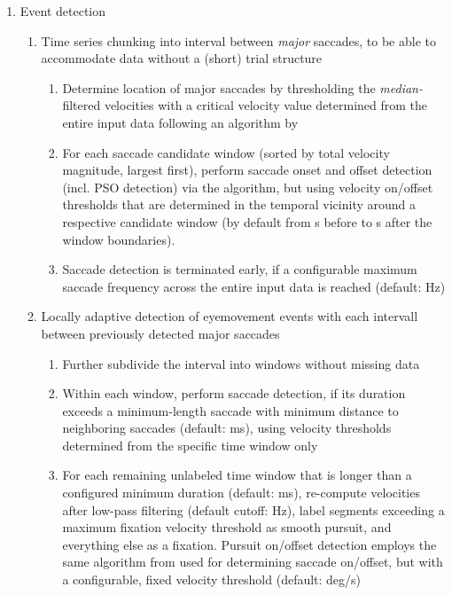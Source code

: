 \documentclass[10pt,a4paper]{extarticle}
\begin{document}
\begin{enumerate}
\begin{enumerate}
    \end{enumerate}
  \item Event detection
    \begin{enumerate}
      \item Time series chunking into interval between \textit{major} saccades, to be able to accommodate data without a (short) trial structure
        \begin{enumerate}
          \item Determine location of major saccades by thresholding the \textit{median-}filtered velocities with a critical velocity value determined from the entire input data following an algorithm by \citep{Nystrom2010AnData}
          \item For each saccade candidate window (sorted by total velocity magnitude, largest first), perform saccade onset and offset detection (incl. PSO detection) via the \citep{Nystrom2010AnData} algorithm, but using velocity on/offset thresholds that are determined in the temporal vicinity around a respective candidate window (by default from \unit[1]{s} before to \unit[1]{s} after the window boundaries).
          \item Saccade detection is terminated early, if a configurable maximum saccade
            frequency across the entire input data is reached (default: \unit[2]{Hz})
        \end{enumerate}
      \item Locally adaptive detection of eyemovement events with each intervall between
        previously detected major saccades
        \begin{enumerate}
          \item Further subdivide the interval into windows without missing data
          \item Within each window, perform saccade detection, if its duration exceeds
            a minimum-length saccade with minimum distance to neighboring saccades
            (default: \unit[130]{ms}), using velocity thresholds determined from the
            specific time window only
          \item For each remaining unlabeled time window that is longer than a
            configured minimum duration (default: \unit[40]{ms}), re-compute velocities
            after low-pass filtering (default cutoff: \unit[4]{Hz}), label segments
            exceeding a maximum fixation velocity threshold
            as smooth pursuit, and everything else as a fixation. Pursuit on/offset
            detection employs the same algorithm from \citep{Nystrom2010AnData} used for
            determining saccade on/offset, but with a configurable, fixed velocity threshold
            (default: \unit[2]{deg/s})
        \end{enumerate}

    \end{enumerate}
\end{enumerate}
\end{document}
